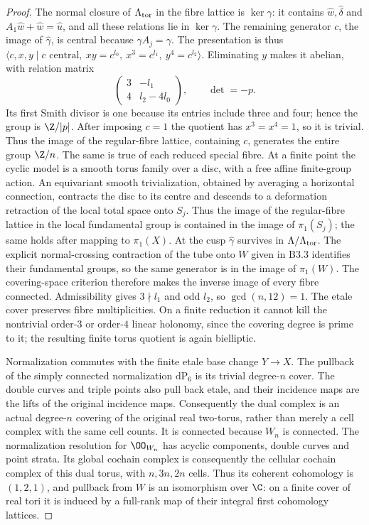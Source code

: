 \begin{proof}
The normal closure of $\Lambda_{\rm tor}$ in the fibre lattice is
$\ker\gamma$: it contains $\hat w,\hat\delta$ and
$A_1\hat w+\hat w=\hat u$, and all these relations lie in
$\ker\gamma$. The remaining generator $c$, the image of
$\hat\gamma$, is central because $\gamma A_j=\gamma$.
The presentation is thus
$\langle c,x,y\mid c\text{ central},\ xy=c^{l_0},\
x^3=c^{l_1},\ y^4=c^{l_2}\rangle$.
Eliminating $y$ makes it abelian, with relation matrix
\[
 \begin{pmatrix}3&-l_1\\4&l_2-4l_0\end{pmatrix},
 \qquad\det=-p.
\]
Its first Smith divisor is one because its entries include three
and four; hence the group is $\Z/|p|$.
After imposing $c=1$ the quotient has $x^3=x^4=1$, so it is trivial.
Thus the image of the regular-fibre lattice, containing $c$, generates
the entire group $\Z/n$. The same is true of each reduced special
fibre. At a finite point the cyclic model is a smooth torus family
over a disc, with a free affine finite-group action. An equivariant
smooth trivialization, obtained by averaging a horizontal connection,
contracts the disc to its centre and descends to a deformation
retraction of the local total space onto $S_j$. Thus the image of
the regular-fibre lattice in the local fundamental group is contained
in the image of $\pi_1(S_j)$; the same holds after mapping to
$\pi_1(X)$. At the cusp $\hat\gamma$ survives in
$\Lambda/\Lambda_{\rm tor}$. The explicit normal-crossing contraction
of the tube onto $W$ given in B3.3 identifies their fundamental groups,
so the same generator is in the image of $\pi_1(W)$.
The covering-space criterion therefore makes the inverse image of
every fibre connected. Admissibility gives $3\nmid l_1$ and odd $l_2$,
so $\gcd(n,12)=1$. The etale cover preserves fibre multiplicities.
On a finite reduction it cannot kill the nontrivial order-$3$ or
order-$4$ linear holonomy, since the covering degree is prime to it;
the resulting finite torus quotient is again bielliptic.

Normalization commutes with the finite etale base change $Y\to X$.
The pullback of the simply connected normalization $\mathrm{dP}_6$
is its trivial degree-$n$ cover. The double curves and triple points
also pull back etale, and their incidence maps are the lifts of the
original incidence maps. Consequently the dual complex is an actual
degree-$n$ covering of the original real two-torus, rather than merely
a cell complex with the same cell counts. It is connected because
$W_n$ is connected. The normalization resolution for $\OO_{W_n}$
has acyclic components, double curves and point strata. Its global
cochain complex is consequently the cellular cochain complex of this
dual torus, with $n,3n,2n$ cells. Thus its coherent cohomology is
$(1,2,1)$, and pullback from $W$ is an isomorphism over $\C$:
on a finite cover of real tori it is induced by a full-rank map of
their integral first cohomology lattices.


\end{proof}
